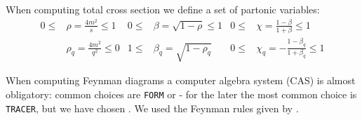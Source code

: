 When computing total cross section we define a set of partonic variables:
\begin{align}
0\leq&\rho = \frac {4m^2} s\leq 1 &0\leq&\beta = \sqrt{1-\rho}\leq 1 &0\leq&\chi = \frac{1-\beta}{1+\beta}\leq 1\\
&\rho_q = \frac {4m^2} {q^2}\leq 0 &1\leq&\beta_q = \sqrt{1-\rho_q} &0\leq&\chi_q = -\frac{1-\beta_q}{1+\beta_q}\leq 1
\end{align}

When computing Feynman diagrams a computer algebra system (CAS) is almost obligatory: common choices are \texttt{FORM}\cite{Vermaseren:2000nd} or \MMa\cite{Mathematica} - for the later the most common choice is \texttt{TRACER}\cite{Tracer}, but we have chosen \HEPMath\cite{wiebusch_hepmath_2015}. We used the Feynman rules given by \cite{Leader}.

